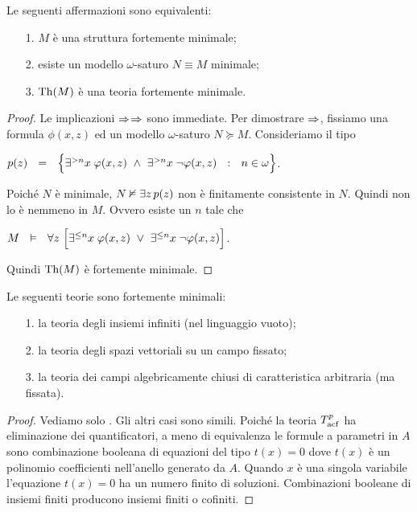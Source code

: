 \begin{theorem}\label{fmequivalenzadefinizioni}
Le seguenti affermazioni sono equivalenti:
\begin{itemize}
\item[1.] $M$ \`e una struttura fortemente minimale;
\item[2.] esiste un modello $\omega$-saturo $N\equiv M$ minimale;
\item[3.] $\textrm{Th}(M)$ \`e una teoria fortemente minimale.
\end{itemize}
\end{theorem}
\begin{proof}
Le implicazioni $\Rightarrow$$\Rightarrow$ sono immediate. Per dimostrare $\Rightarrow$, fissiamo una formula $\phi(x,z)$ ed un modello $\omega$-saturo $N\succeq M$. Consideriamo il tipo 

\hfil$p(z)\ \ =\ \ \Big\{ \E^{> n}x\;\phi(x,z)\ \wedge\ \E^{> n}x\;\neg\phi(x,z) \ \ :\ \ n\in\omega\Big\}$.

Poich\'e $N$ \`e minimale, $N\nvDash \exists z\,p(z)$ non \`e finitamente consistente in $N$. Quindi non lo \`e nemmeno in $M$. Ovvero esiste un $n$ tale che

\hfil$M\ \ \vDash\ \  \forall z\ \Big[\exists^{\le n}x\;\varphi(x,z)\ \vee\ \exists^{\le n}x\;\neg\varphi(x,z)\Big]$.

Quindi $\textrm{Th}(M)$ \`e fortemente minimale.
\end{proof}

\begin{theorem}\label{esempism}
Le seguenti teorie sono fortemente minimali:
\begin{itemize}
\item[1.] la teoria degli insiemi infiniti (nel linguaggio vuoto);
\item[2.] la teoria degli spazi vettoriali su un campo fissato;
\item[3.] la teoria dei campi algebricamente chiusi di caratteristica arbitraria (ma fissata).
\end{itemize}
\end{theorem}
\begin{proof}
Vediamo solo . Gli altri casi sono simili. Poich\'e la teoria  $T^p_{\rm acf}$ ha eliminazione dei quantificatori, a meno di equivalenza le formule a parametri in $A$ sono combinazione booleana di equazioni del tipo $t(x)=0$ dove $t(x)$ \`e un polinomio coefficienti nell'anello generato da $A$. Quando $x$ \`e una singola variabile l'equazione $t(x)=0$ ha un numero finito di soluzioni. Combinazioni booleane di insiemi finiti producono insiemi finiti o cofiniti.  
\end{proof}


